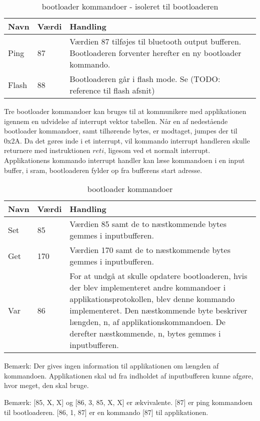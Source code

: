 \begin{table}[H]
	\caption{bootloader kommandoer - isoleret til bootloaderen}
	\label{tab:blappcommands}
	\centering

	\begin{tabular}{|l|l|p{13cm}|}
		\hline
		\textbf{Navn} & \textbf{Værdi} & \textbf{Handling} \\
		\hline
		Ping & 87 & Værdien 87 tilføjes til bluetooth output bufferen. Bootloaderen forventer herefter en ny bootloader kommando.\\
		\hline
		Flash & 88 & Bootloaderen går i flash mode. Se (TODO: reference til flash afsnit) \\
		\hline
	\end{tabular}
\end{table}

Tre bootloader kommandoer kan bruges til at kommunikere med applikationen igennem en udvidelse af interrupt vektor tabellen.
Når en af nedestående bootloader kommandoer, samt tilhørende bytes, er modtaget, jumpes der til 0x2A. Da det gøres inde i et interrupt, vil kommando interrupt handleren skulle returnere med instruktionen $reti$, ligesom ved et normalt interrupt. Applikationens kommando interrupt handler kan læse kommandoen i en input buffer, i sram, bootloaderen fylder op fra bufferens start adresse.

\begin{table}[H]
	\caption{bootloader kommandoer}
	\label{tab:blblcommands}
	\centering

	\begin{tabular}{|l|l|p{13cm}|}
		\hline
		\textbf{Navn} & \textbf{Værdi} & \textbf{Handling} \\
		\hline
		Set & 85 & Værdien 85 samt de to næstkommende bytes gemmes i inputbufferen.\\
		\hline
		Get & 170 & Værdien 170 samt de to næstkommende bytes gemmes i inputbufferen.\\
		\hline
		Var & 86 & For at undgå at skulle opdatere bootloaderen, hvis der blev implementeret andre kommandoer i applikationsprotokollen, blev denne kommando implementeret. Den næstkommende byte beskriver længden, n, af applikationskommandoen. De derefter næstkommende, n, bytes gemmes i inputbufferen.\\
		\hline
	\end{tabular}
\end{table}

\begin{mdquote}
	Bemærk: Der gives ingen information til applikationen om længden af kommandoen. Applikationen skal ud fra indholdet af inputbufferen kunne afgøre, hvor meget, den skal bruge.
\end{mdquote}
\begin{mdquote}
Bemærk: [85, X, X] og [86, 3, 85, X, X] er ækvivalente. [87] er ping kommandoen til bootloaderen. [86, 1, 87] er en kommando [87] til applikationen.
\end{mdquote}

